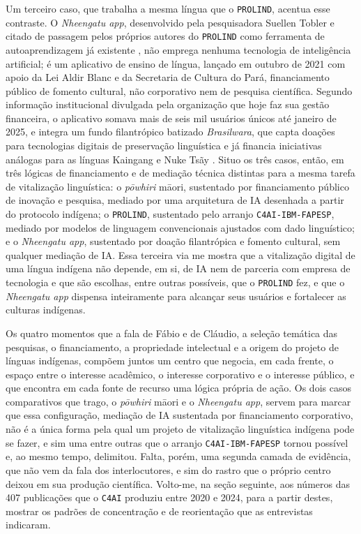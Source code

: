 Um terceiro caso, que trabalha a mesma língua que o \texttt{PROLIND}, acentua esse contraste. O \textit{Nheengatu app}, desenvolvido pela pesquisadora Suellen Tobler e citado de passagem pelos próprios autores do \texttt{PROLIND} como ferramenta de autoaprendizagem já existente \parencite{Pinhanez2024Harnessing}, não emprega nenhuma tecnologia de inteligência artificial; é um aplicativo de ensino de língua, lançado em outubro de 2021 com apoio da Lei Aldir Blanc e da Secretaria de Cultura do Pará, financiamento público de fomento cultural, não corporativo nem de pesquisa científica. Segundo informação institucional divulgada pela organização que hoje faz sua gestão financeira, o aplicativo somava mais de seis mil usuários únicos até janeiro de 2025, e integra um fundo filantrópico batizado \textit{Brasilwara}, que capta doações para tecnologias digitais de preservação linguística e já financia iniciativas análogas para as línguas Kaingang e Nuke Tsãy \parencite{Sitawi2025Nheengatu}. Situo os três casos, então, em três lógicas de financiamento e de mediação técnica distintas para a mesma tarefa de vitalização linguística: o \textit{pōwhiri} māori, sustentado por financiamento público de inovação e pesquisa, mediado por uma arquitetura de IA desenhada a partir do protocolo indígena; o \texttt{PROLIND}, sustentado pelo arranjo \texttt{C4AI-IBM-FAPESP}, mediado por modelos de linguagem convencionais ajustados com dado linguístico; e o \textit{Nheengatu app}, sustentado por doação filantrópica e fomento cultural, sem qualquer mediação de IA. Essa terceira via me mostra que a vitalização digital de uma língua indígena não depende, em si, de IA nem de parceria com empresa de tecnologia e que são escolhas, entre outras possíveis, que o \texttt{PROLIND} fez, e que o \textit{Nheengatu app} dispensa inteiramente para alcançar seus usuários e fortalecer as culturas indígenas. 

Os quatro momentos que a fala de Fábio e de Cláudio, a seleção temática das pesquisas, o financiamento, a propriedade intelectual e a origem do projeto de línguas indígenas, compõem juntos um centro que negocia, em cada frente, o espaço entre o interesse acadêmico, o interesse corporativo e o interesse público, e que encontra em cada fonte de recurso uma lógica própria de ação. Os dois casos comparativos que trago, o \textit{pōwhiri} māori e o \textit{Nheengatu app}, servem para marcar que essa configuração, mediação de IA sustentada por financiamento corporativo, não é a única forma pela qual um projeto de vitalização linguística indígena pode se fazer, e sim uma entre outras que o arranjo \texttt{C4AI-IBM-FAPESP} tornou possível e, ao mesmo tempo, delimitou. Falta, porém, uma segunda camada de evidência, que não vem da fala dos interlocutores, e sim do rastro que o próprio centro deixou em sua produção científica. Volto-me, na seção seguinte, aos números das 407 publicações que o \texttt{C4AI} produziu entre 2020 e 2024, para a partir destes, mostrar os padrões de concentração e de reorientação que as entrevistas indicaram.

